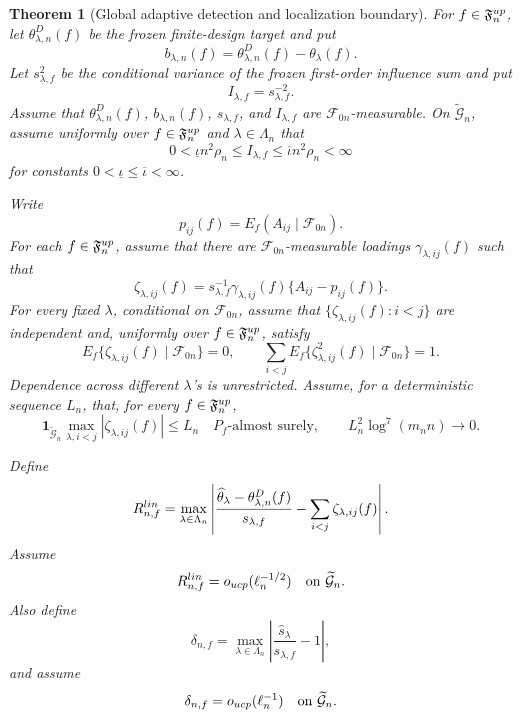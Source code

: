 \documentclass[10pt,a4paper]{amsart}
\newtheorem{theorem}{Theorem}
\begin{document}
\begin{theorem}[Global adaptive detection and localization boundary]
For \(f\in\mathfrak F_n^{\rm up}\), let
\(\theta_{\lambda,n}^{D}(f)\) be the frozen finite-design target and
put
\[
b_{\lambda,n}(f)
=
\theta_{\lambda,n}^{D}(f)-\theta_\lambda(f).
\]
Let \(s_{\lambda,f}^2\) be the conditional variance of the frozen
first-order influence sum and put
\[
I_{\lambda,f}=s_{\lambda,f}^{-2}.
\]
Assume that
\(\theta_{\lambda,n}^{D}(f)\), \(b_{\lambda,n}(f)\),
\(s_{\lambda,f}\), and \(I_{\lambda,f}\) are
\(\mathcal F_{0n}\)-measurable.  On
\(\widetilde{\mathcal G}_n\), assume uniformly over
\(f\in\mathfrak F_n^{\rm up}\) and
\(\lambda\in\Lambda_n\) that
\begin{equation}
0<\underline\iota n^2\rho_n
\le
I_{\lambda,f}
\le
\overline\iota n^2\rho_n
<\infty
\label{eq:t3-7}
\end{equation}
for constants
\(0<\underline\iota\le\overline\iota<\infty\).

Write
\[
p_{ij}(f)
=
E_f(A_{ij}\mid\mathcal F_{0n}).
\]
For each \(f\in\mathfrak F_n^{\rm up}\), assume that there are
\(\mathcal F_{0n}\)-measurable loadings
\(\gamma_{\lambda,ij}(f)\) such that
\[
\zeta_{\lambda,ij}(f)
=
s_{\lambda,f}^{-1}
\gamma_{\lambda,ij}(f)
\{A_{ij}-p_{ij}(f)\}.
\]
For every fixed \(\lambda\), conditional on \(\mathcal F_{0n}\),
assume that
\(\{\zeta_{\lambda,ij}(f):i<j\}\) are independent and, uniformly over
\(f\in\mathfrak F_n^{\rm up}\), satisfy
\begin{equation}
E_f\{\zeta_{\lambda,ij}(f)\mid\mathcal F_{0n}\}=0,
\qquad
\sum_{i<j}
E_f\{\zeta_{\lambda,ij}^2(f)\mid\mathcal F_{0n}\}=1.
\label{eq:t3-8}
\end{equation}
Dependence across different \(\lambda\)'s is unrestricted.  Assume,
for a deterministic sequence \(L_n\), that, for every
\(f\in\mathfrak F_n^{\rm up}\),
\begin{equation}
\mathbf 1_{\widetilde{\mathcal G}_n}
\max_{\lambda,i<j}
|\zeta_{\lambda,ij}(f)|
\le L_n
\quad P_f\text{-almost surely},
\qquad
L_n^2\log^7(m_n n)\to0.
\label{eq:t3-9}
\end{equation}

Define
\[
R_{n,f}^{\rm lin}
=
\max_{\lambda\in\Lambda_n}
\left|
\frac{
\widehat\theta_\lambda-\theta_{\lambda,n}^{D}(f)
}{
s_{\lambda,f}
}
-
\sum_{i<j}\zeta_{\lambda,ij}(f)
\right|.
\]
Assume
\begin{equation}
R_{n,f}^{\rm lin}
=
o_{\rm ucp}(\ell_n^{-1/2})
\quad
\text{on }\widetilde{\mathcal G}_n.
\label{eq:t3-10}
\end{equation}
Also define
\[
\delta_{n,f}
=
\max_{\lambda\in\Lambda_n}
\left|
\frac{\widehat s_\lambda}{s_{\lambda,f}}-1
\right|,
\]
and assume
\begin{equation}
\delta_{n,f}
=
o_{\rm ucp}(\ell_n^{-1})
\quad
\text{on }\widetilde{\mathcal G}_n.
\label{eq:t3-11}
\end{equation}


\end{theorem}
\end{document}
